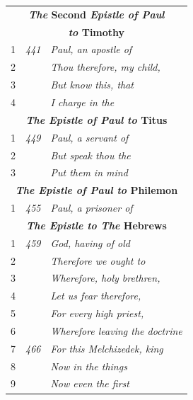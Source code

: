 \documentclass{article}
\newlength{\minipageheight}
\begin{document}
\begin{minipage}[r][\minipageheight][t]{3.3in}
\begin{longtable}{ccl}
        \multicolumn{3}{c}{\textbf{\textit{The} Second \textit{Epistle of Paul}}} \\
        \multicolumn{3}{c}{\textbf{\textit{to} Timothy}}                          \\
        \hline
        1           & \textit{441} & \textit{Paul, an apostle of}                 \\
        2           &              & \textit{Thou therefore, my child,}           \\
        3           &              & \textit{But know this, that}                 \\
        4           &              & \textit{I charge in the}                     \\

        \multicolumn{3}{c}{\textbf{\textit{The Epistle of Paul to} Titus}}        \\
        \hline
        1           & \textit{449} & \textit{Paul, a servant of}                  \\
        2           &              & \textit{But speak thou the}                  \\
        3           &              & \textit{Put them in mind}                    \\

        \multicolumn{3}{c}{\textbf{\textit{The Epistle of Paul to} Philemon}}     \\
        \hline
        1           & \textit{455} & \textit{Paul, a prisoner of}                 \\

        \multicolumn{3}{c}{\textbf{\textit{The Epistle to The} Hebrews}}          \\
        \hline
        1           & \textit{459} & \textit{God, having of old}                  \\
        2           &              & \textit{Therefore we ought to}               \\
        3           &              & \textit{Wherefore, holy brethren,}           \\%
        4           &              & \textit{Let us fear therefore,}              \\
        5           &              & \textit{For every high priest,}              \\
        6           &              & \textit{Wherefore leaving the doctrine}      \\
        7           & \textit{466} & \textit{For this Melchizedek, king}          \\
        8           &              & \textit{Now in the things}                   \\
        9           &              & \textit{Now even the first}                  \\
    \end{longtable}
\end{minipage}%
\end{document}
